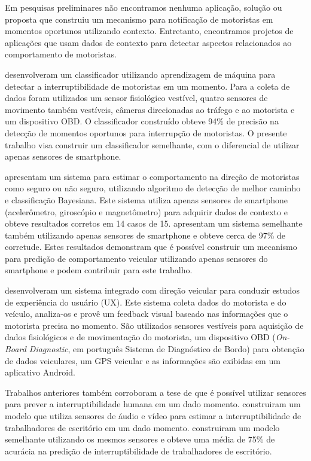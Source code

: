 Em pesquisas preliminares não encontramos nenhuma aplicação, solução ou proposta que construiu um mecanismo para
notificação de motoristas em momentos oportunos utilizando contexto. Entretanto, encontramos projetos de aplicações que
usam dados de contexto para detectar aspectos relacionados ao comportamento de motoristas.

 desenvolveram um classificador utilizando aprendizagem de máquina para detectar a interruptibilidade
de motoristas em um momento. Para a coleta de dados foram utilizados um sensor fisiológico vestível, quatro sensores
de movimento também vestíveis, câmeras direcionadas ao tráfego e ao motorista e um dispositivo OBD. O classificador
construído obteve 94\% de precisão na detecção de momentos oportunos para interrupção de motoristas. O presente
trabalho visa construir um classificador semelhante, com o diferencial de utilizar apenas sensores de smartphone.

 apresentam um sistema para estimar o comportamento na direção de motoristas como seguro ou
não seguro, utilizando algoritmo de detecção de melhor caminho e classificação Bayesiana. Este sistema utiliza
apenas sensores de smartphone (acelerômetro, giroscópio e magnetômetro) para adquirir dados de contexto e obteve
resultados corretos em 14 casos de 15.  apresentam um sistema semelhante também utilizando
apenas sensores de smartphone e obteve cerca de 97\% de corretude. Estes resultados demonstram que é possível construir
um mecanismo para predição de comportamento veicular utilizando apenas sensores do smartphone e podem contribuir
para este trabalho.

 desenvolveram um sistema integrado com direção veicular para conduzir estudos de experiência
do usuário (UX). Este sistema coleta dados do motorista e do veículo, analiza-os e provê um feedback visual baseado
nas informações que o motorista precisa no momento. São utilizados sensores vestíveis para aquisição de dados
fisiológicos e de movimentação do motorista, um dispositivo OBD (\textit{On-Board Diagnostic}, em português Sistema de Diagnóstico
de Bordo) para obtenção de dados veiculares, um GPS veicular e as informações são exibidas em um aplicativo Android.

Trabalhos anteriores também corroboram a tese de que é possível utilizar sensores para prever a interruptibilidade
humana em um dado momento.  construiram um modelo que utiliza sensores de áudio e vídeo
para estimar a interruptibilidade de trabalhadores de escritório em um dado momento. 
construiram um modelo semelhante utilizando os mesmos sensores e obteve uma média de 75\% de acurácia na predição de
interruptibilidade de trabalhadores de escritório.
